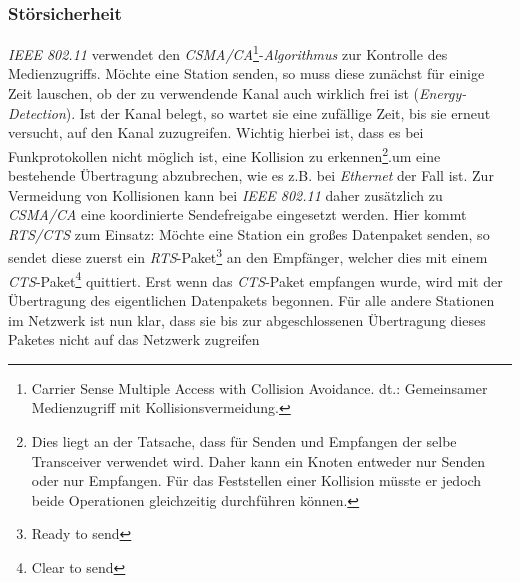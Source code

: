         \subsubsection{Störsicherheit}\label{WlanStoersicherheit}

            \emph{IEEE 802.11} verwendet den \emph{CSMA/CA}\footnote{Carrier Sense Multiple Access with 
            Collision Avoidance. dt.: Gemeinsamer Medienzugriff mit Kollisionsvermeidung.}-\emph{Algorithmus}
            zur Kontrolle des Medienzugriffs. Möchte eine Station senden, so muss diese zunächst
            für einige Zeit lauschen, ob der zu verwendende Kanal auch wirklich frei ist
            (\emph{Energy-Detection}).
            Ist der Kanal belegt, so wartet sie eine zufällige Zeit, bis sie erneut versucht,
            auf den Kanal zuzugreifen. Wichtig hierbei ist, dass es bei Funkprotokollen nicht
            möglich ist, eine Kollision zu erkennen\footnote{Dies liegt an der Tatsache, dass 
                für Senden und Empfangen der selbe Transceiver verwendet wird. 
            Daher kann ein Knoten entweder nur Senden oder nur Empfangen. Für das Feststellen einer Kollision müsste er
            jedoch beide Operationen gleichzeitig durchführen können.}.um eine bestehende Übertragung abzubrechen,
            wie es z.B. bei \textsl{Ethernet} der Fall ist. Zur Vermeidung von Kollisionen
            kann bei \emph{IEEE 802.11} daher zusätzlich zu \emph{CSMA/CA} eine koordinierte Sendefreigabe eingesetzt
            werden. Hier kommt \emph{RTS/CTS} zum Einsatz: Möchte eine Station ein großes Datenpaket
            senden, so sendet diese zuerst ein \emph{RTS}-Paket\footnote{Ready to send} an den Empfänger, 
            welcher dies mit einem \emph{CTS}-Paket\footnote{Clear to send} quittiert. Erst wenn das
            \emph{CTS}-Paket empfangen wurde, wird mit der Übertragung des eigentlichen Datenpakets
            begonnen. Für alle andere Stationen im Netzwerk ist nun klar, dass sie bis zur
            abgeschlossenen Übertragung dieses Paketes nicht auf das Netzwerk zugreifen
